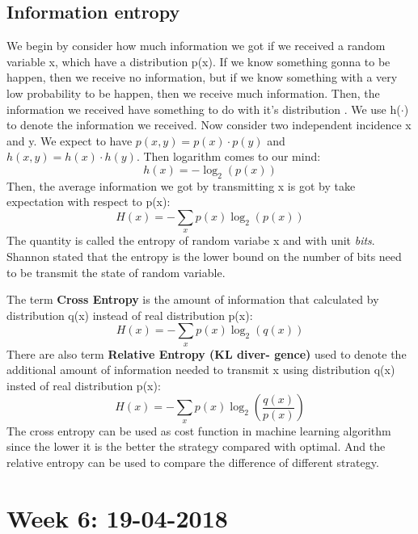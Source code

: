 \documentclass[journal]{IEEEtran}
\begin{document}
\subsection{Information entropy}
We begin by consider how much information we got if we received a random variable x, which have a distribution p(x). If we know something gonna to be happen, then we receive no information, but if we know something with a very low probability to be happen, then we receive much information. Then, the information we received have something to do with it's distribution \cite{nasrabadi2007pattern}. We use h($\cdot$) to denote the information we received. Now consider two independent incidence x and y. We expect to have $p(x,y) = p(x) \cdot p(y)$ and $h(x,y) = h(x) \cdot h(y)$. Then logarithm comes to our mind:
\begin{equation}
  h(x) = -\log_2(p(x))
\end{equation}
Then, the average information we got by transmitting x is got by take expectation with respect to p(x):
\begin{equation}
  H(x) = -\sum \limits_x p(x)\log_2(p(x))
\end{equation}
The quantity is called the entropy of random variabe x and with unit \textsl{bits}. Shannon stated that the entropy is the lower bound on the number of bits need to be transmit the state of random variable.


The term \textbf{Cross Entropy} is the amount of information that calculated by distribution q(x) instead of real distribution p(x):
\begin{equation}
  H(x) = -\sum \limits_x p(x)\log_2(q(x))
\end{equation}
There are also term \textbf{Relative Entropy (KL diver- gence)} used to denote the additional amount of information needed to transmit x using distribution q(x) insted of real distribution p(x):
\begin{equation}
  H(x) = -\sum \limits_x p(x) \log_2(\frac{q(x)}{p(x)})
\end{equation}
The cross entropy can be used as cost function in machine learning algorithm since the lower it is the better the strategy compared with optimal. And the relative entropy can be used to compare the difference of different strategy.

\section{Week 6: 19-04-2018}
\end{document}
